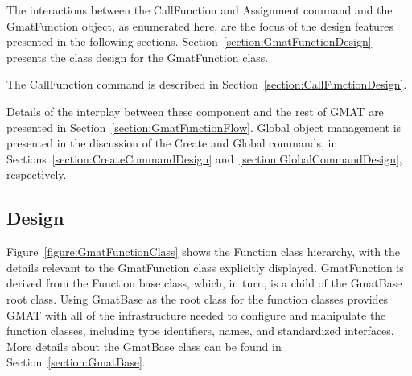 The interactions between the CallFunction and Assignment command and the GmatFunction object, as
enumerated here, are the focus of the design features presented in the following sections.
Section~\ref{section:GmatFunctionDesign} presents the class design for the GmatFunction class.

The CallFunction command is described in Section~\ref{section:CallFunctionDesign}.

Details of the interplay between these component and the rest of GMAT are presented in
Section~\ref{section:GmatFunctionFlow}.  Global object management is presented in the discussion of
the Create and Global commands, in Sections~\ref{section:CreateCommandDesign}
and~\ref{section:GlobalCommandDesign}, respectively.

\subsection{\label{section:GmatFunctionDesign}Design}

Figure~\ref{figure:GmatFunctionClass} shows the Function class hierarchy, with the details relevant
to the GmatFunction class explicitly displayed.  GmatFunction is derived from the Function base
class, which, in turn, is a child of the GmatBase root class.  Using GmatBase as the root class for
the function classes provides GMAT with all of the infrastructure needed to configure and manipulate
the function classes, including type identifiers, names, and standardized interfaces.  More details
about the GmatBase class can be found in Section~\ref{section:GmatBase}.

